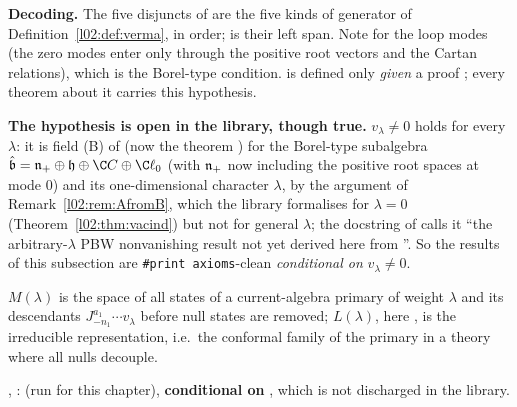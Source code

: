 \begin{dictionary}
\textbf{Decoding.} The five disjuncts of  are the five kinds of generator of
Definition~\ref{l02:def:verma}, in order;  is their left span. Note  for the
loop modes (the zero modes enter only through the positive root vectors and the Cartan relations),
which is the Borel-type condition.  is defined only \emph{given} a proof
; every theorem about it carries this hypothesis.

\textbf{The hypothesis is open in the library, though true.} $v_\lambda\ne0$ holds for every $\lambda$: it is
field (B) of  (now the theorem \allowbreak{}\allowbreak{}) for the Borel-type subalgebra $\hat{\mathfrak b} = \ltwon_+\oplus\mathfrak h\oplus\C C\oplus\C\ell_0$
(with $\mathfrak{n}_+$ now including the positive root spaces at mode $0$) and its one-dimensional character
$\lambda$, by the argument of Remark~\ref{l02:rem:AfromB}, which the library formalises for $\lambda = 0$
(Theorem~\ref{l02:thm:vacind}) but not for general $\lambda$; the
docstring of \allowbreak{}\allowbreak{}\allowbreak{}\allowbreak{}\allowbreak{}\allowbreak{} calls it ``the arbitrary-$\lambda$
PBW nonvanishing result not yet derived here from \allowbreak{}''. So the results of this
subsection are \texttt{\#print axioms}-clean \emph{conditional on} $v_\lambda\ne0$.
\end{dictionary}

\begin{physics}
$M(\lambda)$ is the space of all states of a current-algebra primary of weight $\lambda$ and its
descendants $J^{a_1}_{-n_1}\cdots v_\lambda$ before null states are removed; $L(\lambda)$, here
, is the irreducible representation, i.e.\ the conformal family of the primary in a
theory where all nulls decouple.
\end{physics}

\begin{status}
\allowbreak{}\allowbreak{}\allowbreak{}, \allowbreak{}\allowbreak{}\allowbreak{}\allowbreak{}\allowbreak{}:
 (run for this chapter), \textbf{conditional on}
, which is not discharged in the library.
\end{status}

